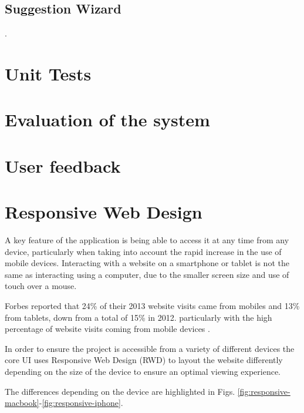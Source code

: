\subsection{Suggestion Wizard}
\label{subsection:suggestion-wizard-walkthrough}.

\section{Unit Tests}

\section{Evaluation of the system}


\section{User feedback}


\section[Responsive Design]{Responsive Web Design}

A key feature of the application is being able to access it at any time from any device, particularly when taking into account the rapid increase in the use of mobile devices.  Interacting with a website on a smartphone or tablet is not the same as interacting using a computer, due to the smaller screen size and use of touch over a mouse.

Forbes reported that 24\% of their 2013 website visits came from mobiles and 13\% from tablets, down from a total of 15\% in 2012. particularly with the high percentage of website visits coming from mobile devices \parencite{steimle2013responsive}.

In order to ensure the project is accessible from a variety of different devices the core UI uses Responsive Web Design (RWD) to layout the website differently depending on the size of the device to ensure an optimal viewing experience.

The differences depending on the device are highlighted in Figs. \ref{fig:responsive-macbook}-\ref{fig:responsive-iphone}.

